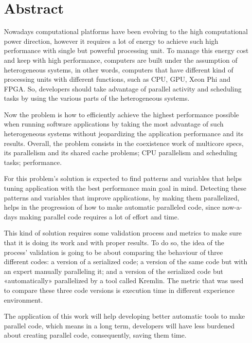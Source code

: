 \chapter*{Abstract}

Nowadays computational platforms have been evolving to the high computational power direction, however it requires a lot of energy to achieve such high performance with single but powerful processing unit.
To manage this energy cost and keep with high performance, computers are built under the assumption of heterogeneous systems, in other words, computers that have different kind of processing units with different functions, such as CPU, GPU, Xeon Phi and FPGA. 
So, developers should take advantage of parallel activity and scheduling tasks by using the various parts of the heterogeneous systems.

Now the problem is how to efficiently achieve the highest performance possible when running software applications by taking the most advantage of such heterogeneous systems without jeopardizing the application performance and its results. 
Overall, the problem consists in the coexistence work of multicore specs, its parallelism and its shared cache problems; CPU parallelism and scheduling tasks; performance.

For this problem's solution is expected to find patterns and variables that helps tuning application with the best performance main goal in mind. Detecting these patterns and variables that improve applications, by making them parallelized, helps in the progression of how to make automatic paralleled code, since now-a-days making parallel code requires a lot of effort and time.

This kind of solution requires some validation process and metrics to make sure that it is doing its work and with proper results. To do so, the idea of the process' validation is going to be about comparing the behaviour of three different codes: a version of  a serialized code; a version of the same code but with an expert manually paralleling it; and a version of the serialized code but «automatically» parallelized by a tool called Kremlin. The metric that was used to compare these three code versions is execution time in different experience environment.

The application of this work will help developing better automatic tools to make parallel code, which means in a long term, developers will have less burdened about creating parallel code, consequently, saving them time.



